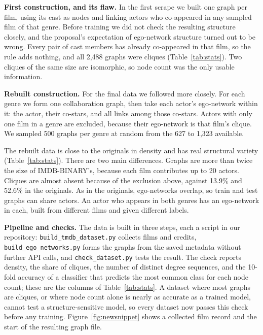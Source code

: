 \documentclass[11pt]{article}
\begin{document}
\textbf{First construction, and its flaw.} In the first scrape we built one graph per film, using its cast as nodes and linking actors who co-appeared in any sampled film of that genre. Before training we did not check the resulting structure closely, and the proposal's expectation of ego-network structure turned out to be wrong. Every pair of cast members has already co-appeared in that film, so the rule adds nothing, and all 2,488 graphs were cliques (Table~\ref{tab:stats}). Two cliques of the same size are isomorphic, so node count was the only usable information.

\textbf{Rebuilt construction.} For the final data we followed \citet{yanardag2015deep} more closely. For each genre we form one collaboration graph, then take each actor's ego-network within it: the actor, their co-stars, and all links among those co-stars. Actors with only one film in a genre are excluded, because their ego-network is that film's clique. We sampled 500 graphs per genre at random from the 627 to 1,323 available.

The rebuilt data is close to the originals in density and has real structural variety (Table~\ref{tab:stats}). There are two main differences. Graphs are more than twice the size of IMDB-BINARY's, because each film contributes up to 20 actors. Cliques are almost absent because of the exclusion above, against 13.9\% and 52.6\% in the originals. As in the originals, ego-networks overlap, so train and test graphs can share actors. An actor who appears in both genres has an ego-network in each, built from different films and given different labels.

\textbf{Pipeline and checks.} The data is built in three steps, each a script in our repository: \texttt{build\_tmdb\_dataset.py} collects films and credits, \texttt{build\_ego\_networks.py} forms the graphs from the saved metadata without further API calls, and \texttt{check\_dataset.py} tests the result. The check reports density, the share of cliques, the number of distinct degree sequences, and the 10-fold accuracy of a classifier that predicts the most common class for each node count; these are the columns of Table~\ref{tab:stats}. A dataset where most graphs are cliques, or where node count alone is nearly as accurate as a trained model, cannot test a structure-sensitive model, so every dataset now passes this check before any training. Figure~\ref{fig:newsnippet} shows a collected film record and the start of the resulting graph file.
\end{document}
